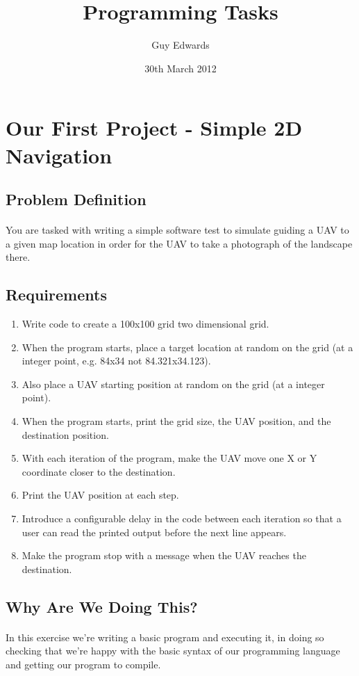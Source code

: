 \documentclass[11pt]{book}
\title{\textbf{Programming Tasks}}
\author{Guy Edwards}
\date{30th March 2012}
\begin{document}
\section{Our First Project - Simple 2D Navigation}

\subsection{Problem Definition}

\paragraph{} You are tasked with writing a simple software test to simulate
guiding a UAV to a given map location in order for the UAV to take a
photograph of the landscape there. 

\subsection{Requirements}

\begin{enumerate}
\item Write code to create a 100x100 grid two dimensional grid.
\item When the program starts, place a target location at random on the grid (at a integer point, e.g. 84x34 not 84.321x34.123).
\item Also place a UAV starting position at random on the grid (at a integer point).
\item When the program starts, print the grid size, the UAV position, and the destination position.
\item With each iteration of the program, make the UAV move one X or Y coordinate closer to the destination.
\item Print the UAV position at each step.
\item Introduce a configurable delay in the code between each iteration so that a user can read the printed output before the next line appears.
\item Make the program stop with a message when the UAV reaches the destination.
\end{enumerate}

\subsection{Why Are We Doing This?}

\paragraph{} In this exercise we're writing a basic program and executing it,
in doing so checking that we're happy with the basic syntax of our programming
language and getting our program to compile.
\end{document}
